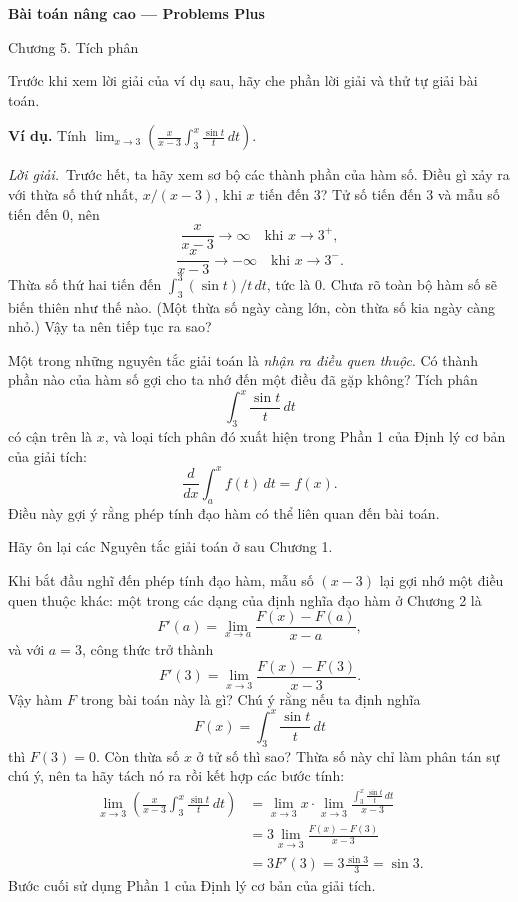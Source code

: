 \documentclass[12pt,a4paper]{article}
\newcommand{\sol}{\par\nopagebreak[4]\noindent\textit{Lời giải.}\ }
\begin{document}
\begin{center}{\LARGE\bfseries Bài toán nâng cao — Problems Plus}\par
{\large Chương 5. Tích phân}\end{center}

Trước khi xem lời giải của ví dụ sau, hãy che phần lời giải và thử tự giải bài toán.

\par\medskip\noindent\textbf{Ví dụ.} Tính $\displaystyle\lim_{x\to3}\left(\frac{x}{x-3}\int_3^x\frac{\sin t}{t}\,dt\right)$.
\sol Trước hết, ta hãy xem sơ bộ các thành phần của hàm số. Điều gì xảy ra với thừa số thứ nhất, $x/(x-3)$, khi $x$ tiến đến 3? Tử số tiến đến 3 và mẫu số tiến đến 0, nên
\[\frac{x}{x-3}\to\infty\quad\text{khi }x\to3^+,\]
\[\frac{x}{x-3}\to-\infty\quad\text{khi }x\to3^-.\]
Thừa số thứ hai tiến đến $\int_3^3(\sin t)/t\,dt$, tức là 0. Chưa rõ toàn bộ hàm số sẽ biến thiên như thế nào. (Một thừa số ngày càng lớn, còn thừa số kia ngày càng nhỏ.) Vậy ta nên tiếp tục ra sao?

Một trong những nguyên tắc giải toán là \textit{nhận ra điều quen thuộc}. Có thành phần nào của hàm số gợi cho ta nhớ đến một điều đã gặp không? Tích phân
\[\int_3^x\frac{\sin t}{t}\,dt\]
có cận trên là $x$, và loại tích phân đó xuất hiện trong Phần 1 của Định lý cơ bản của giải tích:
\[\frac{d}{dx}\int_a^xf(t)\,dt=f(x).\]
Điều này gợi ý rằng phép tính đạo hàm có thể liên quan đến bài toán.

Hãy ôn lại các Nguyên tắc giải toán ở sau Chương 1.

Khi bắt đầu nghĩ đến phép tính đạo hàm, mẫu số $(x-3)$ lại gợi nhớ một điều quen thuộc khác: một trong các dạng của định nghĩa đạo hàm ở Chương 2 là
\[F'(a)=\lim_{x\to a}\frac{F(x)-F(a)}{x-a},\]
và với $a=3$, công thức trở thành
\[F'(3)=\lim_{x\to3}\frac{F(x)-F(3)}{x-3}.\]
Vậy hàm $F$ trong bài toán này là gì? Chú ý rằng nếu ta định nghĩa
\[F(x)=\int_3^x\frac{\sin t}{t}\,dt\]
thì $F(3)=0$. Còn thừa số $x$ ở tử số thì sao? Thừa số này chỉ làm phân tán sự chú ý, nên ta hãy tách nó ra rồi kết hợp các bước tính:
\begin{align*}
\lim_{x\to3}\left(\frac{x}{x-3}\int_3^x\frac{\sin t}{t}\,dt\right)
&=\lim_{x\to3}x\cdot\lim_{x\to3}\frac{\displaystyle\int_3^x\frac{\sin t}{t}\,dt}{x-3}\\
&=3\lim_{x\to3}\frac{F(x)-F(3)}{x-3}\\
&=3F'(3)=3\frac{\sin3}{3}=\sin3.
\end{align*}
Bước cuối sử dụng Phần 1 của Định lý cơ bản của giải tích.
\end{document}
